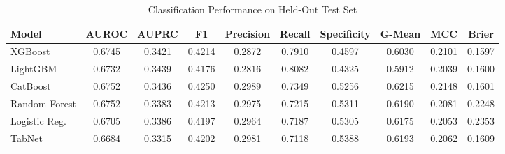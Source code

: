 \begin{table}
\centering
\caption{Classification Performance on Held-Out Test Set}
\label{tab:results}
\begin{tabular}{lccccccccc}
\toprule
Model & AUROC & AUPRC & F1 & Precision & Recall & Specificity & G-Mean & MCC & Brier \\
\midrule
XGBoost & 0.6745 & 0.3421 & 0.4214 & 0.2872 & 0.7910 & 0.4597 & 0.6030 & 0.2101 & 0.1597 \\
LightGBM & 0.6732 & 0.3439 & 0.4176 & 0.2816 & 0.8082 & 0.4325 & 0.5912 & 0.2039 & 0.1600 \\
CatBoost & 0.6752 & 0.3436 & 0.4250 & 0.2989 & 0.7349 & 0.5256 & 0.6215 & 0.2148 & 0.1601 \\
Random Forest & 0.6752 & 0.3383 & 0.4213 & 0.2975 & 0.7215 & 0.5311 & 0.6190 & 0.2081 & 0.2248 \\
Logistic Reg. & 0.6705 & 0.3386 & 0.4197 & 0.2964 & 0.7187 & 0.5305 & 0.6175 & 0.2053 & 0.2353 \\
TabNet & 0.6684 & 0.3315 & 0.4202 & 0.2981 & 0.7118 & 0.5388 & 0.6193 & 0.2062 & 0.1609 \\
\bottomrule
\end{tabular}
\end{table}
